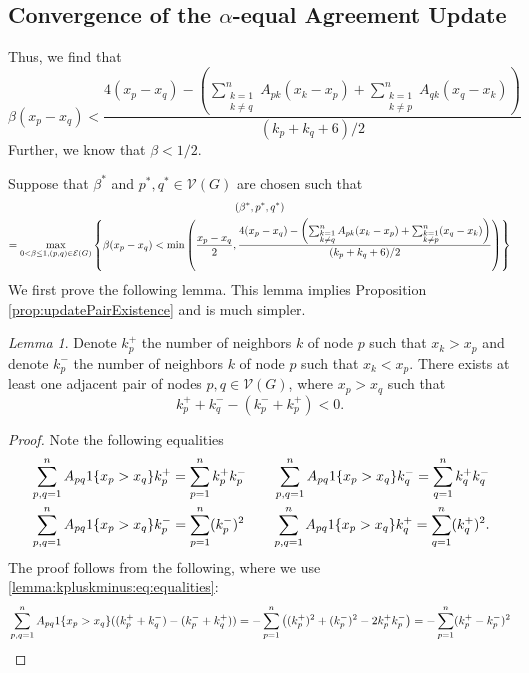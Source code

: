 \documentclass{article}
\theoremstyle{remark}
\newtheorem{lemma}{Lemma}
\begin{document}
\subsection{Convergence of the $\alpha$-equal Agreement Update}

Thus, we find that
\begin{equation}
	\beta(x_p-x_q) < \frac{4(x_p-x_q) - \left(\sum_{\substack{k=1\\k\neq q}}^nA_{pk}(x_k-x_p) + \sum_{\substack{k=1\\k\neq p}}^nA_{qk}(x_q-x_k)\right)}{(k_p+k_q+6)/2} 
\end{equation}
Further, we know that $\beta<1/2$.

Suppose that $\beta^*$ and $p^*,q^*\in\mathcal{V}(G)$ are chosen such that
\begin{multline}{\label{eq:greedyUpdateRule}}
	(\beta^*,p^*,q^*) \\= \max_{0<\beta\leq 1,(p,q)\in\mathcal{E}(G)}\left\{\beta(x_p-x_q) < \min\left(\frac{x_p-x_q}{2},\frac{4(x_p-x_q) - \left(\sum_{\substack{k=1\\k\neq q}}^nA_{pk}(x_k-x_p) + \sum_{\substack{k=1\\k\neq p}}^n(x_q-x_k)\right)}{(k_p+k_q+6)/2}\right)\right\} 
\end{multline}
We first prove the following lemma. This lemma implies Proposition \ref{prop:updatePairExistence} and is much simpler.
\begin{lemma}{\label{lemma:kpluskminus}}
	Denote $k_p^+$ the number of neighbors $k$ of node $p$ such that $x_k>x_p$ and denote $k_p^-$ the number of neighbors $k$ of node $p$ such that $x_k<x_p$. There exists at least one adjacent pair of nodes $p,q\in\mathcal{V}(G)$, where $x_p>x_q$ such that
	\begin{equation*}
		k^+_p+k^-_q - (k^-_p+k^+_p) < 0.	
	\end{equation*}
\end{lemma}
\begin{proof}
	Note the following equalities 
	\begin{equation}{\label{lemma:kpluskminus:eq:equalities}}
	\begin{aligned}
		&\sum_{p,q=1}^nA_{pq}1\{x_p>x_q\}k_p^+ = \sum_{p=1}^nk_p^+k_p^- \quad &\sum_{p,q=1}^nA_{pq}1\{x_p>x_q\}k_q^- = \sum_{q=1}^nk_q^+k_q^-\\
		&\sum_{p,q=1}^nA_{pq}1\{x_p>x_q\}k_p^- = \sum_{p=1}^n(k_p^-)^2 \quad &\sum_{p,q=1}^nA_{pq}1\{x_p>x_q\}k_q^+ = \sum_{q=1}^n(k_q^+)^2.
	\end{aligned}
	\end{equation}
	The proof follows from the following, where we use \eqref{lemma:kpluskminus:eq:equalities}: 
	\begin{equation}{\label{lemma:kpluskminus:eq:negative}}
		\sum_{p,q=1}^nA_{pq}1\{x_p>x_q\}((k_p^++k_q^-) - (k_p^-+k_q^+)) = -\sum_{p=1}^n\left((k_p^+)^2+(k_p^-)^2-2k_p^+k_p^-\right) = -\sum_{p=1}^n(k_p^+-k_p^-)^2 
	\end{equation}
\end{proof}
\end{document}
